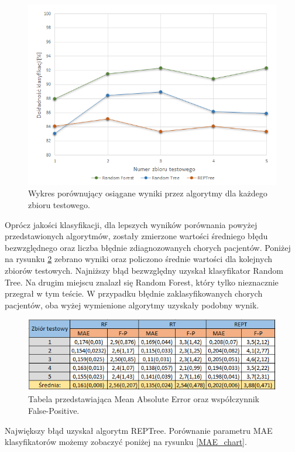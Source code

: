 \documentclass[conference]{IEEEtran}
\begin{document}
\begin{figure}[htbp]
\centerline{\includegraphics[scale=0.65]{pic/CV_chart.png}}
\caption{Wykres porównujący osiągane wyniki przez algorytmy dla każdego zbioru testowego.}
\label{CV_chart}
\end{figure}

Oprócz jakości klasyfikacji, dla lepszych wyników porównania powyżej przedstawionych algorytmów, zostały zmierzone wartości średniego błędu bezwzględnego oraz liczba błędnie zdiagnozowanych chorych pacjentów. Poniżej na rysunku \ref{MAE_table} zebrano wyniki oraz policzono średnie wartości dla kolejnych zbiorów testowych. Najniższy błąd bezwzględny uzyskał klasyfikator Random Tree. Na drugim miejscu znalazł się Random Forest, który tylko nieznacznie przegrał w tym teście. W przypadku błędnie zaklasyfikowanych chorych pacjentów, oba wyżej wymienione algorytmy uzyskały podobny wynik.

\begin{figure}[htbp]
\centerline{\includegraphics[scale=0.58]{pic/MAE_table.png}}
\caption{Tabela przedstawiająca Mean Absolute Error oraz współczynnik False-Positive.}
\label{MAE_table}
\end{figure}

Największy błąd uzyskał algorytm REPTree. Porównanie parametru MAE klasyfikatorów możemy zobaczyć poniżej na rysunku \ref{MAE_chart}. 
\end{document}
